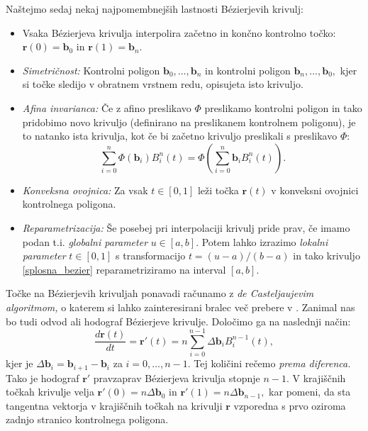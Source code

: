 \documentclass[12pt,a4paper,twoside]{article}
\theoremstyle{definition} %
\theoremstyle{plain} %
\theoremstyle{primerstyle}
\numberwithin{equation}{section}  %
\newcommand{\bV}{\mathbf{b}}
\newcommand{\rV}{\mathbf{r}}
\begin{document}
Naštejmo sedaj nekaj najpomembnejših lastnosti Bézierjevih krivulj:
\begin{itemize}
	\item Vsaka Bézierjeva krivulja interpolira začetno in končno kontrolno točko: $\rV(0)=\bV_0$ in $\rV(1)=\bV_n.$
	\item \emph{Simetričnost:} Kontrolni poligon $\bV_0,\dots,\bV_n$ in kontrolni poligon $\bV_n,\dots,\bV_0,$ kjer si točke sledijo v obratnem vrstnem redu, opisujeta isto krivuljo.
	\item \emph{Afina invarianca:} Če z afino preslikavo $\Phi$ preslikamo kontrolni poligon in tako pridobimo novo krivuljo (definirano na preslikanem kontrolnem poligonu), je to natanko ista krivulja, kot če bi začetno krivuljo preslikali s preslikavo $\Phi$:
	$$\sum_{i=0}^n\Phi(\bV_i)B_i^n(t)=\Phi\left(\sum_{i=0}^n\bV_iB_i^n(t)\right).$$
	\item \emph{Konveksna ovojnica:} Za vsak $t\in[0,1]$ leži točka $\rV(t)$ v konveksni ovojnici kontrolnega poligona.
	\item \emph{Reparametrizacija:} Še posebej pri interpolaciji krivulj pride prav, če imamo podan t.i. \emph{globalni parameter} $u\in[a,b].$ Potem lahko izrazimo \emph{lokalni parameter} $t\in[0,1]$ s transformacijo $t=(u-a)/(b-a)$ in tako krivuljo \eqref{splosna_bezier} reparametriziramo na interval $[a,b]$.
\end{itemize}
Točke na Bézierjevih krivuljah ponavadi računamo z \emph{de Casteljaujevim algoritmom,} o katerem si lahko zainteresirani bralec več prebere v \cite[str.\ 80]{farin2002handbook}. Zanimal nas bo tudi odvod ali hodograf Bézierjeve krivulje. Določimo ga na naslednji način:
\begin{equation}
	\label{odvod_bezier}
	\frac{d\rV(t)}{dt}=\rV'(t)=n\sum_{i=0}^{n-1}\Delta\bV_iB_i^{n-1}(t),
\end{equation}
kjer je $\Delta\bV_i=\bV_{i+1}-\bV_i$ za $i=0,\dots,n-1.$ Tej količini rečemo \emph{prema diferenca.} Tako je hodograf $\rV'$ pravzaprav Bézierjeva krivulja stopnje $n-1.$ V krajiščnih točkah krivulje velja $\rV'(0)=n\Delta\bV_0$ in $\rV'(1)=n\Delta\bV_{n-1},$ kar pomeni, da sta tangentna vektorja v krajiščnih točkah na krivulji $\rV$ vzporedna s prvo oziroma zadnjo stranico kontrolnega poligona.
\end{document}
